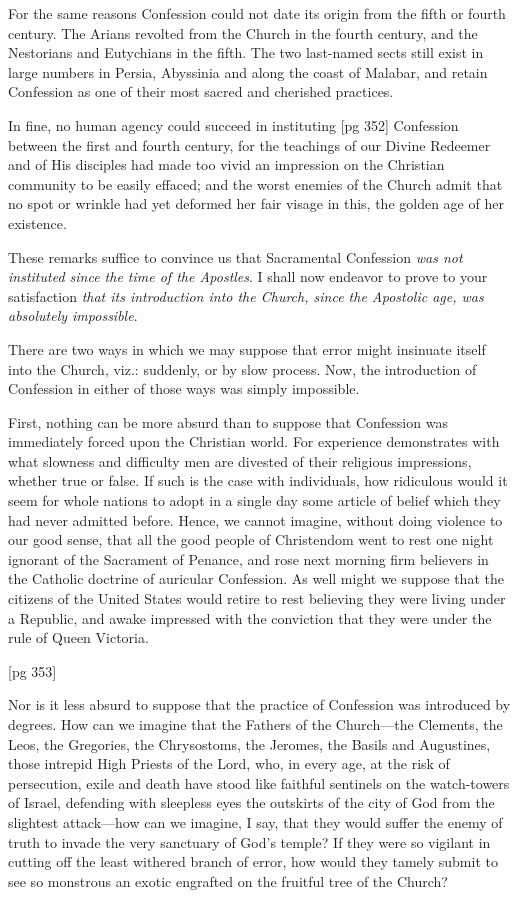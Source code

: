 For the same reasons Confession could not date
its origin from the fifth or fourth century. The
Arians revolted from the Church in the fourth
century, and the Nestorians and Eutychians in the
fifth. The two last-named sects still exist in large
numbers in Persia, Abyssinia and along the coast
of Malabar, and retain Confession as one of their
most sacred and cherished practices.

In fine, no human agency could succeed in instituting
[pg 352]
Confession between the first and fourth century,
for the teachings of our Divine Redeemer
and of His disciples had made too vivid an impression
on the Christian community to be easily effaced;
and the worst enemies of the Church admit
that no spot or wrinkle had yet deformed her fair
visage in this, the golden age of her existence.

These remarks suffice to convince us that Sacramental
Confession \emph{was not instituted since the
time of the Apostles}. I shall now endeavor to
prove to your satisfaction \emph{that its introduction
into the Church, since the Apostolic age, was absolutely
impossible}.

There are two ways in which we may suppose
that error might insinuate itself into the Church,
viz.: suddenly, or by slow process. Now, the introduction
of Confession in either of those ways
was simply impossible.

First, nothing can be more absurd than to suppose
that Confession was immediately forced upon
the Christian world. For experience demonstrates
with what slowness and difficulty men are divested
of their religious impressions, whether true or
false. If such is the case with individuals, how
ridiculous would it seem for whole nations to
adopt in a single day some article of belief which
they had never admitted before. Hence, we cannot
imagine, without doing violence to our good
sense, that all the good people of Christendom
went to rest one night ignorant of the Sacrament
of Penance, and rose next morning firm believers
in the Catholic doctrine of auricular Confession.
As well might we suppose that the citizens of the
United States would retire to rest believing they
were living under a Republic, and awake impressed
with the conviction that they were under
the rule of Queen Victoria.

[pg 353]

Nor is it less absurd to suppose that the practice
of Confession was introduced by degrees. How
can we imagine that the Fathers of the Church—the
Clements, the Leos, the Gregories, the Chrysostoms,
the Jeromes, the Basils and Augustines,
those intrepid High Priests of the Lord, who, in
every age, at the risk of persecution, exile and
death have stood like faithful sentinels on the
watch-towers of Israel, defending with sleepless
eyes the outskirts of the city of God from the
slightest attack—how can we imagine, I say, that
they would suffer the enemy of truth to invade the
very sanctuary of God's temple? If they were
so vigilant in cutting off the least withered branch
of error, how would they tamely submit to see so
monstrous an exotic engrafted on the fruitful tree
of the Church?

